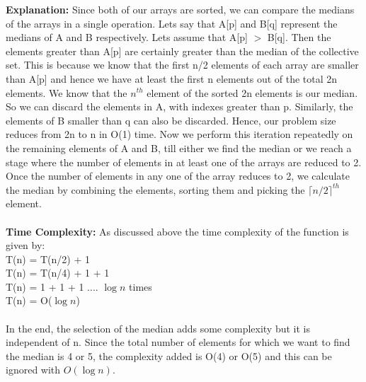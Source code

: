 \documentclass[10pt]{article}
\begin{document}
\textbf{Explanation:} Since both of our arrays are sorted, we can compare the medians of the arrays in a single operation. Lets say that A[p] and B[q] represent the medians of A and B respectively. Lets assume that A[p] $>$ B[q]. Then the elements greater than A[p] are certainly greater than the median of the collective set. This is because we know that the first n/2 elements of each array are smaller than A[p] and hence we have at least the first n elements out of the total 2n elements. We know that the $n^{th}$ element of the sorted 2n elements is our median. So we can discard the elements in A, with indexes greater than p. Similarly, the elements of B smaller than q can also be discarded. Hence, our problem size reduces from 2n to n in O(1) time. Now we perform this iteration repeatedly on the remaining elements of A and B, till either we find the median or we reach a stage where the number of elements in at least one of the arrays are reduced to 2. Once the number of elements in any one of the array reduces to 2, we calculate the median by combining the elements, sorting them and picking the $\lceil n/2 \rceil^{th}$ element.\\\\
\textbf{Time Complexity: } As discussed above the time complexity of the function is given by:\\
T(n) = T(n/2) + 1\\
T(n) = T(n/4) + 1 + 1\\
T(n) = 1 + 1 + 1 .... $\log n$ times\\
T(n) = O($\log n$)\\\\
In the end, the selection of the median adds some complexity but it is independent of n. Since the total number of elements for which we want to find the median is 4 or 5, the complexity added is O(4) or O(5) and this can be ignored with $O(\log n)$.
\newpage
\end{document}
